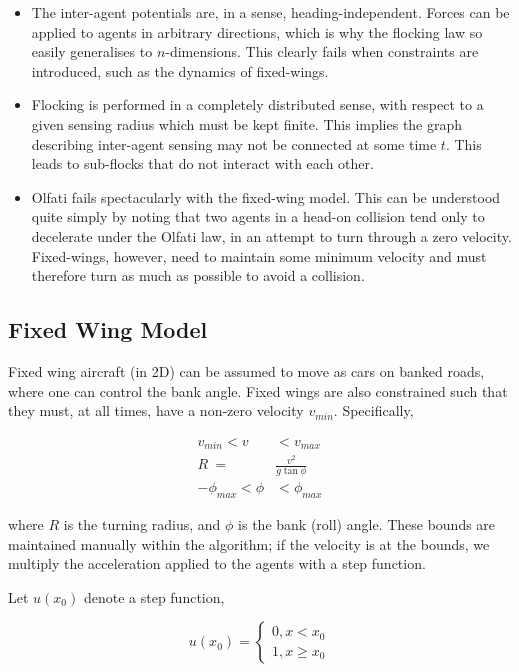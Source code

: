 \documentclass[letterpaper, 10 pt, conference]{ieeeconf}  %
\begin{document}
\begin{itemize}
    \item The inter-agent potentials are, in a sense, heading-independent. Forces can be applied to agents in arbitrary directions, which is why the flocking law so easily generalises to $n$-dimensions. This clearly fails when constraints are introduced, such as the dynamics of fixed-wings. 
    \item Flocking is performed in a completely distributed sense, with respect to a given sensing radius which must be kept finite. This implies the graph describing inter-agent sensing may not be connected at some time $t$. This leads to sub-flocks that do not interact with each other. 
    \item Olfati fails spectacularly with the fixed-wing model. This can be understood quite simply by noting that two agents in a head-on collision tend only to decelerate under the Olfati law, in an attempt to turn through a zero velocity. Fixed-wings, however, need to maintain some minimum velocity and must therefore turn as much as possible to avoid a collision.
\end{itemize}

\subsection{Fixed Wing Model}

Fixed wing aircraft (in 2D) can be assumed to move as cars on banked roads, where one can control the bank angle. Fixed wings are also constrained such that they must, at all times, have a non-zero velocity $v_{min}$. Specifically,

\begin{center}
\begin{align}
v_{min} < v & < v_{max}\\
R \ =  \ & \frac{v^2}{g\tan\phi}\\
-\phi_{max} < \phi & < \phi_{max}
\end{align}
\end{center}

where $R$ is the turning radius, and $\phi$ is the bank (roll) angle. These bounds are maintained manually within the algorithm; if the velocity is at the bounds, we multiply the acceleration applied to the agents with a step function. 

Let $u(x_0)$ denote a step function, 

\begin{equation}
    u(x_0) = 
    \begin{cases}
        0, x < x_0 \\
        1, x \geq x_0
    \end{cases}
\end{equation}
\end{document}
